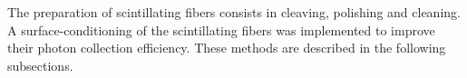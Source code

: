 The preparation of scintillating fibers consists in cleaving, polishing and cleaning. A surface-conditioning of the scintillating fibers was implemented to improve their photon collection efficiency. These methods are described in the following subsections.

